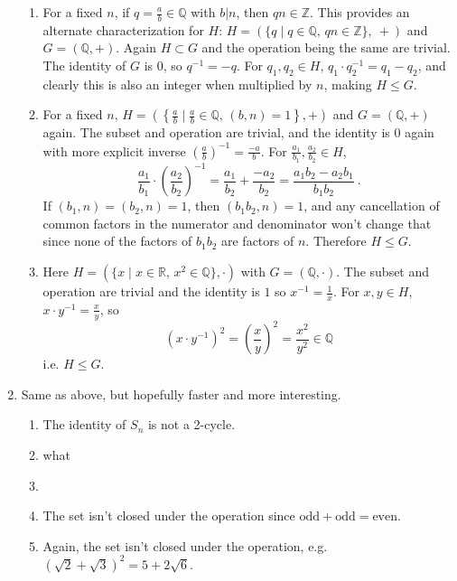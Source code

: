 \documentclass[]{article}
\newcommand{\bbz}{\mathbb{Z}}
\newcommand{\bbq}{\mathbb{Q}}
\newcommand{\bbr}{\mathbb{R}}
\begin{document}
\begin{enumerate}
\begin{enumerate}
\item For a fixed $n$, if $q = \frac{a}{b} \in \bbq$ with $b\vert n$, then $qn\in \bbz$. This provides an alternate characterization for $H$: $H = ( \{q\mid q\in\bbq ,\,qn\in\bbz \},\ + )$ and $G = (\bbq, +)$. Again $H \subset G$ and the operation being the same are trivial. The identity of $G$ is $0$, so $q^{-1} = -q$. For $q_1, q_2\in H$, $q_1\cdot q_2^{-1} = q_1-q_2$, and clearly this is also an integer when multiplied by $n$, making $H \leq G$.

\item For a fixed $n$, $H = \left( \left\{ \frac{a}{b}\mid \frac{a}{b}\in\bbq,\, (b,n)=1 \right\}, + \right)$ and $G = (\bbq, +)$ again. The subset and operation are trivial, and the identity is $0$ again with more explicit inverse $\left( \frac{a}{b} \right)^{-1} = \frac{-a}{b}$. For $\frac{a_1}{b_1},\frac{a_2}{b_2}\in H$,
\begin{equation}
\frac{a_1}{b_1}\cdot \left( \frac{a_2}{b_2} \right)^{-1} = \frac{a_1}{b_2}+ \frac{-a_2}{b_2} = \frac{a_1b_2-a_2b_1}{b_1b_2}\ .
\end{equation}
If $(b_1,n) = (b_2,n) = 1$, then $(b_1b_2,n) = 1$, and any cancellation of common factors in the numerator and denominator won't change that since none of the factors of $b_1b_2$ are factors of $n$. Therefore $H \leq G$.

\item Here $H = ( \{ x\mid x\in\bbr,\, x^2\in\bbq \}, \cdot)$ with $G = (\bbq,\cdot)$. The subset and operation are trivial and the identity is $1$ so $x^{-1} = \frac{1}{x}$. For $x,y\in H$, $x\cdot y^{-1} = \frac{x}{y}$, so 
\begin{equation}
(x\cdot y^{-1})^2 = \left(\frac{x}{y}\right)^2 = \frac{x^2}{y^2} \in \bbq
\end{equation}
i.e. $H\leq G$.

\end{enumerate}


\item Same as above, but hopefully faster and more interesting.
\begin{enumerate}
\item The identity of $S_n$ is not a 2-cycle.
\item {\color{red} what}
\item 
\item The set isn't closed under the operation since $\text{odd} + \text{odd} = \text{even}$.
\item Again, the set isn't closed under the operation, e.g. $(\sqrt{2} + \sqrt{3})^2 = 5 + 2\sqrt{6}$.
\end{enumerate}



\end{enumerate}
\end{document}

